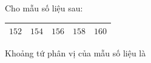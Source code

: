 \begin{ex}
Cho mẫu số liệu sau:
\begin{center}
\begin{tabular}{|c|c|c|c|c|}\hline
$152$ & $154$ & $156$ & $158$ & $160$\\\hline
\end{tabular}
\end{center}
Khoảng tứ phân vị của mẫu số liệu là
\end{ex}

